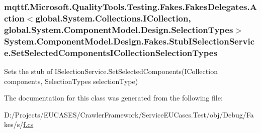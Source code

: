\hypertarget{class_system_1_1_component_model_1_1_design_1_1_fakes_1_1_stub_i_selection_service_a857ee34b042165483e424118f5262725}{
\subsubsection[{Set\-Selected\-Components\-I\-Collection\-Selection\-Types}]{\setlength{\rightskip}{0pt plus 5cm}mqttf.\-Microsoft.\-Quality\-Tools.\-Testing.\-Fakes.\-Fakes\-Delegates.\-Action$<$global.\-System.\-Collections.\-I\-Collection, global.\-System.\-Component\-Model.\-Design.\-Selection\-Types$>$ System.\-Component\-Model.\-Design.\-Fakes.\-Stub\-I\-Selection\-Service.\-Set\-Selected\-Components\-I\-Collection\-Selection\-Types}}\label{class_system_1_1_component_model_1_1_design_1_1_fakes_1_1_stub_i_selection_service_a857ee34b042165483e424118f5262725}


Sets the stub of I\-Selection\-Service.\-Set\-Selected\-Components(\-I\-Collection components, Selection\-Types selection\-Type)



The documentation for this class was generated from the following file\-:\begin{DoxyCompactItemize}
\item 
D\-:/\-Projects/\-E\-U\-C\-A\-S\-E\-S/\-Crawler\-Framework/\-Service\-E\-U\-Cases.\-Test/obj/\-Debug/\-Fakes/s/\hyperlink{s_2f_8cs}{f.\-cs}\end{DoxyCompactItemize}
